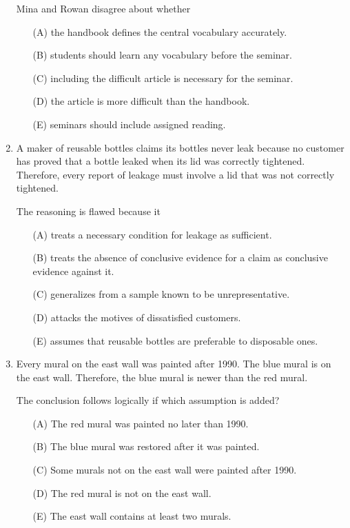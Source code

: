 \begin{enumerate}
Mina and Rowan disagree about whether
\begin{enumerate}
\item[(A)] the handbook defines the central vocabulary accurately.
\item[(B)] students should learn any vocabulary before the seminar.
\item[(C)] including the difficult article is necessary for the seminar.
\item[(D)] the article is more difficult than the handbook.
\item[(E)] seminars should include assigned reading.
\end{enumerate}

\item A maker of reusable bottles claims its bottles never leak because no customer has proved that a bottle leaked when its lid was correctly tightened. Therefore, every report of leakage must involve a lid that was not correctly tightened.

The reasoning is flawed because it
\begin{enumerate}
\item[(A)] treats a necessary condition for leakage as sufficient.
\item[(B)] treats the absence of conclusive evidence for a claim as conclusive evidence against it.
\item[(C)] generalizes from a sample known to be unrepresentative.
\item[(D)] attacks the motives of dissatisfied customers.
\item[(E)] assumes that reusable bottles are preferable to disposable ones.
\end{enumerate}

\item Every mural on the east wall was painted after 1990. The blue mural is on the east wall. Therefore, the blue mural is newer than the red mural.

The conclusion follows logically if which assumption is added?
\begin{enumerate}
\item[(A)] The red mural was painted no later than 1990.
\item[(B)] The blue mural was restored after it was painted.
\item[(C)] Some murals not on the east wall were painted after 1990.
\item[(D)] The red mural is not on the east wall.
\item[(E)] The east wall contains at least two murals.
\end{enumerate}


\end{enumerate}
